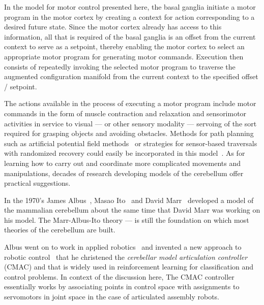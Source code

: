 \documentclass[letterpaper,11pt]{article}
\def\urlh#1{{}}
\def\emdash{---}
\begin{document}
In the model for motor control presented here, the basal ganglia initiate a motor program in the motor cortex by creating a context for action corresponding to a desired future state. Since the motor cortex already has access to this information, all that is required of the basal ganglia is an offset from the current context to serve as a setpoint, thereby enabling the motor cortex to select an appropriate motor program for generating motor commands. Execution then consists of repeatedly invoking the selected motor program to traverse the augmented configuration manifold from the current context to the specified offset / setpoint.

The actions available in the process of executing a motor program include motor commands in the form of muscle contraction and relaxation and sensorimotor activities in service to visual {\emdash{}} or other sensory modality {\emdash{}} servoing of the sort required for grasping objects and avoiding obstacles. Methods for path planning such as artificial potential field methods~\cite{KhatibIJRR-86} or strategies for sensor-based traversals with randomized recovery could easily be incorporated in this model~\cite{LiarokapisetalICAR-15}. As for learning how to carry out and coordinate more complicated movements and manipulations, decades of research developing models of the cerebellum offer practical suggestions.


In the 1970's James Albus~\cite{AlbusMB-71}, Masao Ito~\cite{Ecclesetal1967neuronal} and David Marr~\cite{MarrJoP-69} developed a model of the mammalian cerebellum about the same time that David Marr was working on his model. The Marr-Albus-Ito theory {\emdash{}} is still the {\urlh{https://en.wikipedia.org/wiki/Cerebellum#Theories_and_computational_models}{foundation}} on which most theories of the cerebellum are built.

Albus went on to work in applied robotics~\cite{AlbusetalSME-84} and invented a new approach to robotic control~\cite{Albus75} that he christened the {\it{cerebellar model articulation controller}} ({\urlh{https://en.wikipedia.org/wiki/Cerebellar_model_articulation_controller}{CMAC}}) and that is widely used in reinforcement learning for classification and control problems. In context of the discussion here, The CMAC controller essentially works by associating points in control space with assignments to servomotors in joint space in the case of articulated assembly robots.
\end{document}
